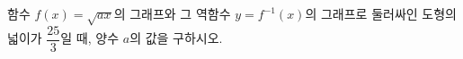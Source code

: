 함수 $f(x)=\sqrt{ax}$의 그래프와 그 역함수 $y=f^{-1}(x)$의 그래프로 둘러싸인 도형의 넓이가 $\dfrac{25}{3}$일 때, 양수 $a$의 값을 구하시오.
